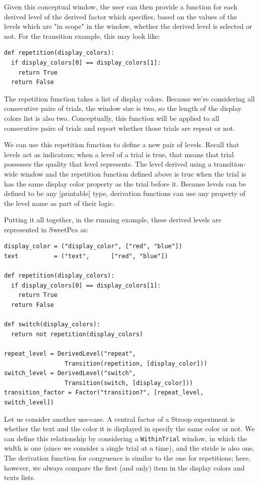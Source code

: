 Given this conceptual window, the user can then provide a function for each derived level of the derived factor which specifies, based on the values of the levels which are "in scope" in the window, whether the derived level is selected or not. For the transition example, this may look like:

\begin{verbatim}
def repetition(display_colors):
  if display_colors[0] == display_colors[1]:
    return True
  return False
\end{verbatim}

The repetition function takes a list of display colors. Because we're considering all consecutive pairs of trials, the window size is two, so the length of the display colors list is also two. Conceptually, this function will be applied to all consecutive pairs of trials and report whether those trials are repeat or not.

We can use this repetition function to define a new pair of levels. Recall that levels act as indicators; when a level of a trial is true, that means that trial possesses the quality that level represents. The level derived using a transition-wide window and the repetition function defined above is true when the trial is has the same display color property as the trial before it. Because levels can be defined to be any [printable] type, derivation functions can use any property of the level name as part of their logic.

Putting it all together, in the running example, these derived levels are represented in SweetPea as:

\begin{verbatim}
display_color = ("display_color", ["red", "blue"])
text          = ("text",      ["red", "blue"])

def repetition(display_colors):
  if display_colors[0] == display_colors[1]:
    return True
  return False

def switch(display_colors):
  return not repetition(display_colors)

repeat_level = DerivedLevel("repeat",
                 Transition(repetition, [display_color]))
switch_level = DerivedLevel("switch",
                 Transition(switch, [display_color]))
transition_factor = Factor("transition?", [repeat_level, switch_level])

\end{verbatim}

Let us consider another use-case. A central factor of a Stroop experiment is whether the text and the color it is displayed in specify the same color or not. We can define this relationship by considering a \texttt{WithinTrial} window, in which the width is one (since we consider a single trial at a time), and the stride is also one. The derivation function for congruence is similar to the one for repetitions; here, however, we always compare the first (and only) item in the display colors and texts lists.

